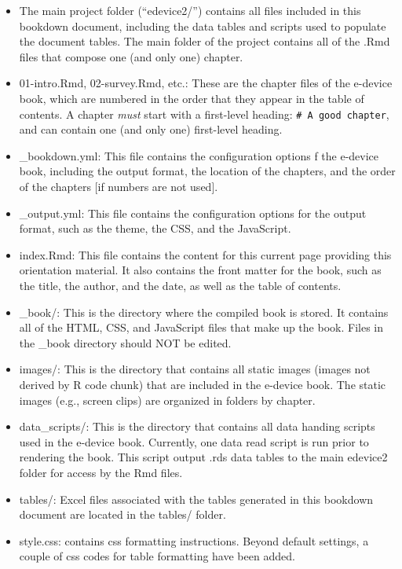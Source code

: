 \documentclass[
]{book}
\begin{document}
\begin{itemize}
\item
  The main project folder (``edevice2/'') contains all files included in this bookdown document, including the data tables and scripts used to populate the document tables. The main folder of the project contains all of the .Rmd files that compose one (and only one) chapter.
\item
  01-intro.Rmd, 02-survey.Rmd, etc.: These are the chapter files of the e-device book, which are numbered in the order that they appear in the table of contents. A chapter \emph{must} start with a first-level heading: \texttt{\#\ A\ good\ chapter}, and can contain one (and only one) first-level heading.
\item
  \_bookdown.yml: This file contains the configuration options f the e-device book, including the output format, the location of the chapters, and the order of the chapters {[}if numbers are not used{]}.
\item
  \_output.yml: This file contains the configuration options for the output format, such as the theme, the CSS, and the JavaScript.
\item
  index.Rmd: This file contains the content for this current page providing this orientation material. It also contains the front matter for the book, such as the title, the author, and the date, as well as the table of contents.
\item
  \_book/: This is the directory where the compiled book is stored. It contains all of the HTML, CSS, and JavaScript files that make up the book. Files in the \_book directory should NOT be edited.
\item
  images/: This is the directory that contains all static images (images not derived by R code chunk) that are included in the e-device book. The static images (e.g., screen clips) are organized in folders by chapter.
\item
  data\_scripts/: This is the directory that contains all data handing scripts used in the e-device book. Currently, one data read script is run prior to rendering the book. This script output .rds data tables to the main edevice2 folder for access by the Rmd files.
\item
  tables/: Excel files associated with the tables generated in this bookdown document are located in the tables/ folder.
\item
  style.css: contains css formatting instructions. Beyond default settings, a couple of css codes for table formatting have been added.
\end{itemize}
\end{document}
